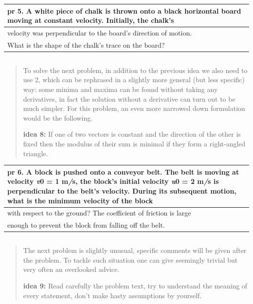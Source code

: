 \documentclass[
]{article}
\author{}
\date{}
\begin{document}
\begin{longtable}[]{@{}l@{}}
\toprule
\textbf{pr 5.} A white piece of chalk is thrown onto a black horizontal
board moving at constant velocity. Initially, the chalk's \\
\midrule
\endhead
velocity was perpendicular to the board's direction of motion. \\
What is the shape of the chalk's trace on the board? \\
\bottomrule
\end{longtable}

\begin{longtable}[]{@{}l@{}}
\toprule
\endhead
 \\
\bottomrule
\end{longtable}

\begin{quote}
To solve the next problem, in addition to the previous idea we also need
to use 2, which can be rephrased in a slightly more general (but less
speciﬁc) way: some minima and maxima can be found without taking any
derivatives, in fact the solution without a derivative can turn out to
be much simpler. For this problem, an even more narrowed down
formulation would be the following.

\textbf{idea 8:} If one of two vectors is constant and the direction of
the other is ﬁxed then the modulus of their sum is minimal if they form
a right-angled triangle.
\end{quote}

\begin{longtable}[]{@{}l@{}}
\toprule
\textbf{pr 6.} A block is pushed onto a conveyor belt. The belt is
moving at velocity \emph{v}0 = 1 m\emph{/}s, the block's initial
velocity \emph{u}0 = 2 m\emph{/}s is perpendicular to the belt's
velocity. During its subsequent motion, what is the minimum velocity of
the block \\
\midrule
\endhead
with respect to the ground? The coeﬃcient of friction is large \\
enough to prevent the block from falling oﬀ the belt. \\
\bottomrule
\end{longtable}

\begin{longtable}[]{@{}l@{}}
\toprule
\endhead
 \\
\bottomrule
\end{longtable}

\begin{quote}
The next problem is slightly unusual, speciﬁc comments will be given
after the problem. To tackle such situation one can give seemingly
trivial but very often an overlooked advice.

\textbf{idea 9:} Read carefully the problem text, try to understand the
meaning of every statement, don't make hasty assumptions by yourself.
\end{quote}
\end{document}
